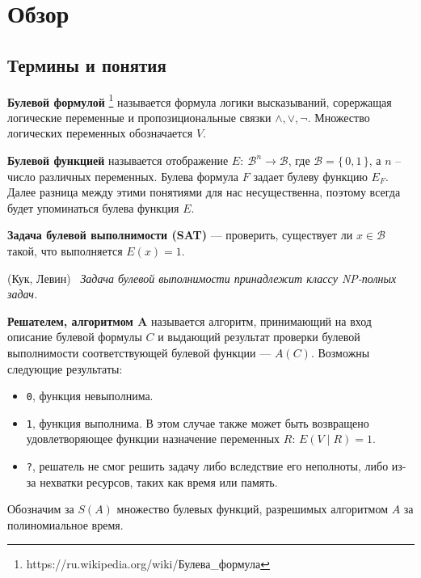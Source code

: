 \chapter{Обзор}\label{overview}

\section{Термины и понятия}\label{overview:terms}

\begin{definition}\label{overview:formula}
    \textbf{Булевой формулой} \footnote{https://ru.wikipedia.org/wiki/Булева\_формула} называется 
    формула логики высказываний, сорержащая логические переменные и пропозициональные связки
    $\wedge, \vee, \neg$. Множество логических переменных обозначается $V$.
\end{definition}

\begin{definition}
    \textbf{Булевой функцией} называется отображение $E\colon~ \mathcal{B}^n \to \mathcal{B}$,
    где $\mathcal{B} = \{\, 0, 1 \,\}$, а $n$ -- число различных переменных. Булева формула $F$ 
    задает булеву функцию $E_F$. Далее разница между этими понятиями для нас несущественна, поэтому
    всегда будет упоминаться булева функция $E$.
\end{definition}

\begin{definition}
    \textbf{Задача булевой выполнимости (SAT)} --- проверить, существует ли $x \in \mathcal{B}$
    такой, что выполняется $E(x) = 1$.
\end{definition}

\begin{theorem}(Кук, Левин)~\cite{bib:cook-levin}
    \textit{Задача булевой выполнимости принадлежит классу NP-полных задач.}
\end{theorem}

\begin{definition}
    \textbf{Решателем, алгоритмом A} называется алгоритм, принимающий на вход описание булевой формулы $C$
    и выдающий результат проверки булевой выполнимости соответствующей булевой функции --- $A(C)$.
    Возможны следующие результаты:
    \begin{itemize}
        \item \texttt{0}, функция невыполнима.
        \item \texttt{1}, функция выполнима. В этом случае также может быть возвращено
            удовлетворяющее функции назначение переменных $R$: $E(V \mid R) = 1$.
        \item \texttt{?}, решатель не смог решить задачу либо вследствие его неполноты, либо
            из-за нехватки ресурсов, таких как время или память.
    \end{itemize}
    Обозначим за $S(A)$ множество булевых функций, разрешимых алгоритмом $A$ за полиномиальное время.
\end{definition}

